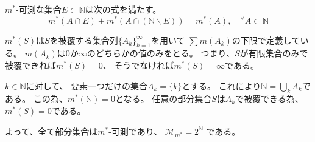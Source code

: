 \documentclass[12pt,b5paper]{ltjsarticle}
\begin{document}
\begin{enumerate}
      \dotfill

      $m^{*}$-可測な集合$E\subset \mathbb{N}$は次の式を満たす。
      \begin{equation}
       m^{*}(A\cap E) + m^{*}(A\cap (\mathbb{N}\backslash E)) = m^{*}(A)
        ,\quad {}^{\forall}A\subset \mathbb{N}
      \end{equation}

      $m^{*}(S)$は$S$を被覆する集合列$\{A_{k}\}_{k=1}^{\infty}$を用いて
      $\sum m(A_{k})$の下限で定義している。
      $m(A_{k})$は$0$か$\infty$のどちらかの値のみをとる。
      つまり、$S$が有限集合のみで被覆できれば$m^{*}(S)=0$、
      そうでなければ$m^{*}(S)=\infty$である。

      $k\in\mathbb{N}$に対して、
      要素一つだけの集合$A_{k}=\{k\}$とする。
      これにより$\mathbb{N}=\bigcup_{k} A_{k}$である。
      この為、$m^{*}(\mathbb{N})=0$となる。
      任意の部分集合$S$は$A_{k}$で被覆できる為、
      $m^{*}(S)=0$である。

      よって、全て部分集合は$m^{*}$-可測であり、
      $\mathcal{M}_{m^{*}} = 2^{\mathbb{N}}$
      である。
      

      \hrulefill

\end{enumerate}

\hrulefill
\end{document}
